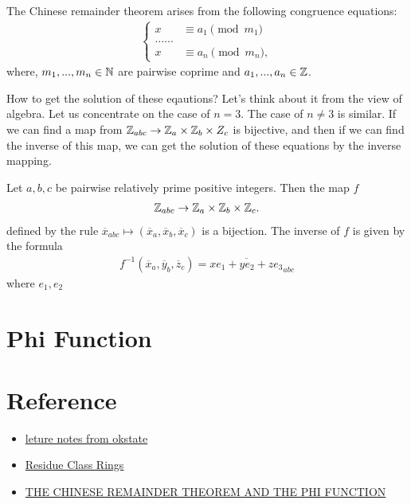 The Chinese remainder theorem arises from the following congruence equations: 
\begin{align*}
    \left\{\begin{matrix}
       x &\equiv a_1\pmod {m_1}\\
       ......\\
       x &\equiv a_n\pmod {m_n},
    \end{matrix}\right.
\end{align*}
where, 
$m_1,...,m_n\in \mathbb{N}$ are pairwise coprime and $a_1,...,a_n\in\mathbb{Z}$. 

How to get the solution of these eqautions? Let's think about it from the view of algebra.
Let us concentrate on the case of $n=3$. The case of $n\neq 3$ is similar.
If we can find a map from $\mathbb{Z}_{abc}\rightarrow \mathbb{Z}_a\times \mathbb{Z}_b\times Z_c$ is bijective, 
and then if we can find the inverse of this map, we can get the solution of these equations by the inverse mapping.

\begin{theorem}{}{}
    Let $a,b,c$ be pairwise relatively prime positive integers. Then the map $f$
    \begin{align*}
        \mathbb{Z}_{abc}\rightarrow \mathbb{Z}_a\times \mathbb{Z}_b\times \mathbb{Z}_c.
    \end{align*}
    defined by the rule $\overline{x}_{abc}\mapsto (\overline{x}_a,\overline{x}_b,\overline{x}_c)$ 
    is a bijection.
    The inverse of $f$ is given by the formula
    \begin{align*}
        f^{-1}(\overline{x}_a,\overline{y}_b,\overline{z}_c) = \overline{xe_1+ye_2+ze_3}_{abc}
    \end{align*}
    where $e_1,e_2$
\end{theorem}




\section{Phi Function}

\section{Reference}
\begin{itemize}
    \item \href{https://math.okstate.edu/people/binegar/3613/3613-l11.pdf}{leture notes from okstate}
    \item \href{https://www.mathi.uni-heidelberg.de/~flemmermeyer/pell/bfc03.pdf}{Residue Class Rings}
    \item \href{https://public.csusm.edu/aitken_html/m422/Handout6.pdf}{THE CHINESE REMAINDER THEOREM AND THE PHI FUNCTION}
\end{itemize}